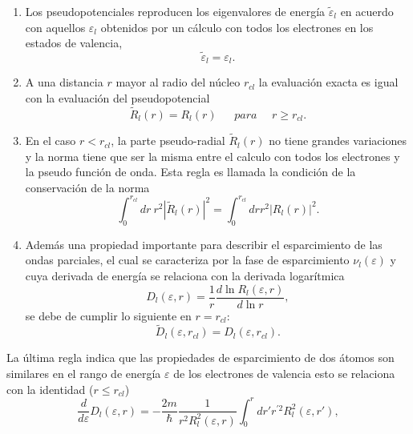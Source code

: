    \begin{enumerate}
   	\item Los pseudopotenciales reproducen los eigenvalores de energ\'ia $\tilde{\varepsilon}_l$ en acuerdo con aquellos $\varepsilon_l$ obtenidos por un c\'alculo con todos los electrones en los estados de valencia,
   	\begin{equation*}
   	\tilde{\varepsilon}_l = \varepsilon_l.
   	\end{equation*}  
   	\item A una distancia $r$ mayor al radio del n\'ucleo $r_{cl}$ la evaluaci\'on exacta es igual con la evaluaci\'on del pseudopotencial
   	\begin{equation*}
   	\tilde{R}_l (r) = R_l (r)~~~~~~~para~~~~~~r\ge r_{cl}.
   	\end{equation*}
   	\item \label{listNorm} En el caso $r < r_{cl}$, la parte pseudo-radial $\tilde{R}_l (r)$ no tiene grandes variaciones  y la norma tiene que ser la misma entre el calculo con todos los electrones y la pseudo funci\'on de onda. Esta regla es llamada la condici\'on de la conservaci\'on de la norma
   	\begin{equation*}
   	\int_{0}^{r_{cl}} dr~ r^2 |\tilde{R}_l (r)|^2 = \int_{0}^{r_{cl}} dr r^2 |R_l (r)|^2.
   	\end{equation*}
   	\item Adem\'as una propiedad importante para describir el esparcimiento de las ondas parciales, el cual se caracteriza por la fase de esparcimiento $\nu_l (\varepsilon)$ y cuya derivada de energ\'ia se relaciona con la derivada logar\'itmica \cite{Ziman-1972} 
   	\begin{equation}
   	D_l (\varepsilon, r) = \frac{1}{r} \frac{d \ln R_l (\varepsilon, r)}{d \ln r},
   	\end{equation}
   	se debe de cumplir lo siguiente en $r=r_{cl}$:
   	\begin{equation}
   	\tilde{D}_l (\varepsilon, r_{cl})= D_l (\varepsilon, r_{cl}) .
   	\end{equation}
   	
   \end{enumerate}
   La \'ultima regla indica que las propiedades de esparcimiento de dos \'atomos son similares en el rango de energ\'ia $\varepsilon$ de los electrones de valencia esto se relaciona con la identidad ($r \le r_{cl} $)
   \begin{equation}
   \frac{d}{d \varepsilon} D_l (\varepsilon, r) = - \frac{2 m }{\hbar} \frac{1}{r^2 R_l ^2 (\varepsilon, r)} \int_{0}^{r} dr' r^{'2} R_l ^2 (\varepsilon, r'), \label{ec:freidelSum} 
   \end{equation}
